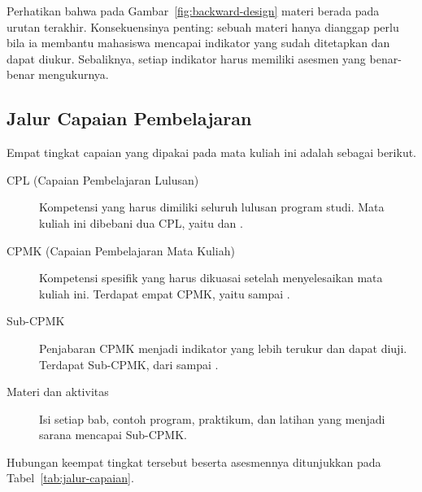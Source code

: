 Perhatikan bahwa pada Gambar~\ref{fig:backward-design} materi berada
pada urutan terakhir. Konsekuensinya penting: sebuah materi hanya
dianggap perlu bila ia membantu mahasiswa mencapai indikator yang
sudah ditetapkan dan dapat diukur. Sebaliknya, setiap indikator harus
memiliki asesmen yang benar-benar mengukurnya.

\subsection{Jalur Capaian Pembelajaran}

Empat tingkat capaian yang dipakai pada mata kuliah ini adalah
sebagai berikut.

\begin{description}
    \item[CPL (Capaian Pembelajaran Lulusan)] Kompetensi yang harus
          dimiliki seluruh lulusan program studi. Mata kuliah ini
          dibebani dua CPL, yaitu  dan .

    \item[CPMK (Capaian Pembelajaran Mata Kuliah)] Kompetensi
          spesifik yang harus dikuasai setelah menyelesaikan mata
          kuliah ini. Terdapat empat CPMK, yaitu  sampai
          .

    \item[Sub-CPMK] Penjabaran CPMK menjadi indikator yang lebih
          terukur dan dapat diuji. Terdapat  Sub-CPMK, dari
           sampai .

    \item[Materi dan aktivitas] Isi setiap bab, contoh program,
          praktikum, dan latihan yang menjadi sarana mencapai
          Sub-CPMK.
\end{description}

Hubungan keempat tingkat tersebut beserta asesmennya ditunjukkan pada
Tabel~\ref{tab:jalur-capaian}.

